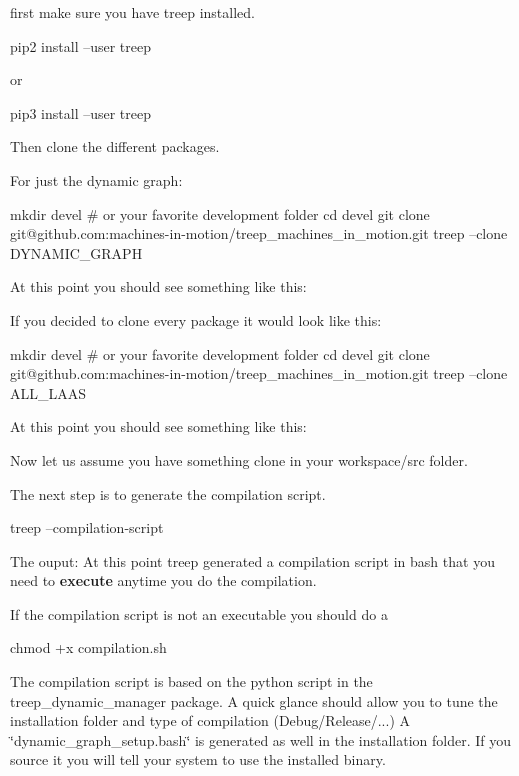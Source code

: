 \begin{DoxyEnumerate}
\item first make sure you have treep installed. 
\begin{DoxyCode}
pip2 install --user treep
\end{DoxyCode}
 or 
\begin{DoxyCode}
pip3 install --user treep
\end{DoxyCode}

\item Then clone the different packages.
\begin{DoxyItemize}
\item For just the dynamic graph\+: 
\begin{DoxyCode}
mkdir devel # or your favorite development folder
cd devel
git clone git@github.com:machines-in-motion/treep\_machines\_in\_motion.git
treep --clone DYNAMIC\_GRAPH
\end{DoxyCode}
 At this point you should see something like this\+: 
\item If you decided to clone every package it would look like this\+: 
\begin{DoxyCode}
mkdir devel # or your favorite development folder
cd devel
git clone git@github.com:machines-in-motion/treep\_machines\_in\_motion.git
treep --clone ALL\_LAAS
\end{DoxyCode}
 At this point you should see something like this\+: 
\end{DoxyItemize}
\item Now let us assume you have something clone in your workspace/src folder.
\begin{DoxyItemize}
\item The next step is to generate the compilation script. 
\begin{DoxyCode}
treep --compilation-script
\end{DoxyCode}
 The ouput\+:  At this point treep generated a compilation script in bash that you need to {\bfseries execute} anytime you do the compilation.
\item If the compilation script is not an executable you should do a 
\begin{DoxyCode}
chmod +x compilation.sh
\end{DoxyCode}
 The compilation script is based on the python script in the treep\+\_\+dynamic\+\_\+manager package. A quick glance should allow you to tune the installation folder and type of compilation (Debug/\+Release/...) A \char`\"{}dynamic\+\_\+graph\+\_\+setup.\+bash\char`\"{} is generated as well in the installation folder. If you source it you will tell your system to use the installed binary.

\end{DoxyItemize}
\end{DoxyEnumerate}
